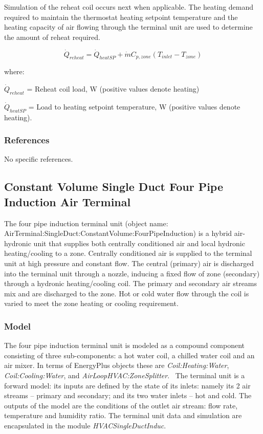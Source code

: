 Simulation of the reheat coil occurs next when applicable. The heating demand required to maintain the thermostat heating setpoint temperature and the heating capacity of air flowing through the terminal unit are used to determine the amount of reheat required.

\begin{equation}
{\dot Q_{reheat}} = {\dot Q_{heatSP}} + \dot m C_{p,zone}(T_{inlet}-T_{zone})
\end{equation}

where:

\({\dot Q_{reheat}}\) = Reheat coil load, W (positive values denote heating)

\({\dot Q_{heatSP}}\) = Load to heating setpoint temperature, W (positive values denote heating).

\subsubsection{References}\label{references-001}

No specific references.

\subsection{Constant Volume Single Duct Four Pipe Induction Air Terminal}\label{constant-volume-single-duct-four-pipe-induction-air-terminal}

The four pipe induction terminal unit (object name: \\ AirTerminal:SingleDuct:ConstantVolume:FourPipeInduction) is a hybrid air-hydronic unit that supplies both centrally conditioned air and local hydronic heating/cooling to a zone. Centrally conditioned air is supplied to the terminal unit at high pressure and constant flow. The central (primary) air is discharged into the terminal unit through a nozzle, inducing a fixed flow of zone (secondary) through a hydronic heating/cooling coil. The primary and secondary air streams mix and are discharged to the zone. Hot or cold water flow through the coil is varied to meet the zone heating or cooling requirement.

\subsubsection{Model}\label{model}

The four pipe induction terminal unit is modeled as a compound component consisting of three sub-components: a hot water coil, a chilled water coil and an air mixer. In terms of EnergyPlus objects these are \emph{Coil:Heating:Water}, \emph{Coil:Cooling:Water}, and \emph{AirLoopHVAC:ZoneSplitter}.~ The terminal unit is a forward model: its inputs are defined by the state of its inlets: namely its 2 air streams -- primary and secondary; and its two water inlets -- hot and cold. The outputs of the model are the conditions of the outlet air stream: flow rate, temperature and humidity ratio. The terminal unit data and simulation are encapsulated in the module \emph{HVACSingleDuctInduc}.

